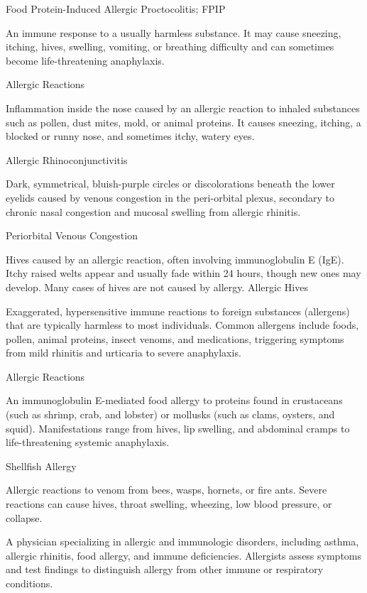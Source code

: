 \synonyms
Food Protein-Induced Allergic Proctocolitis; FPIP

 An immune response to a usually harmless substance. It may cause sneezing, itching, hives, swelling, vomiting, or breathing difficulty and can sometimes become life-threatening anaphylaxis.

\synonyms
Allergic Reactions

 Inflammation inside the nose caused by an allergic reaction to inhaled substances such as pollen, dust mites, mold, or animal proteins. It causes sneezing, itching, a blocked or runny nose, and sometimes itchy, watery eyes.

\synonyms
Allergic Rhinoconjunctivitis

 Dark, symmetrical, bluish-purple circles or discolorations beneath the lower eyelids caused by venous congestion in the peri-orbital plexus, secondary to chronic nasal congestion and mucosal swelling from allergic rhinitis.

\synonyms
Periorbital Venous Congestion

 Hives caused by an allergic reaction, often involving immunoglobulin E (IgE). Itchy raised welts appear and usually fade within 24 hours, though new ones may develop. Many cases of hives are not caused by allergy.
\synonyms
Allergic Hives

 Exaggerated, hypersensitive immune reactions to foreign substances (allergens) that are typically harmless to most individuals. Common allergens include foods, pollen, animal proteins, insect venoms, and medications, triggering symptoms from mild rhinitis and urticaria to severe anaphylaxis.

\synonyms
Allergic Reactions

 An immunoglobulin E-mediated food allergy to proteins found in crustaceans (such as shrimp, crab, and lobster) or mollusks (such as clams, oysters, and squid). Manifestations range from hives, lip swelling, and abdominal cramps to life-threatening systemic anaphylaxis.

\synonyms
Shellfish Allergy

 Allergic reactions to venom from bees, wasps, hornets, or fire ants. Severe reactions can cause hives, throat swelling, wheezing, low blood pressure, or collapse.

 A physician specializing in allergic and immunologic disorders, including asthma, allergic rhinitis, food allergy, and immune deficiencies. Allergists assess symptoms and test findings to distinguish allergy from other immune or respiratory conditions.

